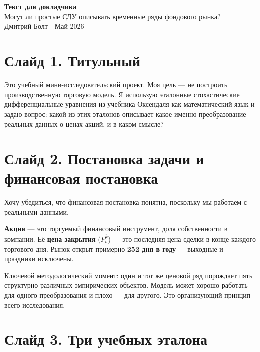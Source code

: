 \documentclass[12pt,a4paper]{article}
\begin{document}
\begin{center}
  {\LARGE\bfseries Текст для докладчика}\\[6pt]
  {\large Могут ли простые СДУ описывать временные ряды фондового рынка?}\\[4pt]
  {\color{slidegray} Дмитрий Болт\quad---\quad Май 2026}
\end{center}

\bigskip

\section{Слайд 1. Титульный}

Это учебный мини-исследовательский проект.
Моя цель --- не построить производственную торговую модель.
Я использую эталонные стохастические дифференциальные уравнения
из учебника Оксендаля как математический язык
и задаю вопрос: какой из этих эталонов описывает
какое именно преобразование реальных данных о ценах акций, и в каком смысле?

\section{Слайд 2. Постановка задачи и финансовая постановка}

Хочу убедиться, что финансовая постановка понятна, поскольку мы работаем
с реальными данными.

\textbf{Акция} --- это торгуемый финансовый инструмент, доля собственности
в компании.
Её \textbf{цена закрытия} ($P_t^k$) --- это последняя цена сделки
в конце каждого торгового дня.
Рынок открыт примерно \textbf{252 дня в году} ---
выходные и праздники исключены.

Ключевой методологический момент: один и тот же ценовой ряд порождает
пять структурно различных эмпирических объектов.
Модель может хорошо работать для одного преобразования и плохо --- для другого.
Это организующий принцип всего исследования.

\section{Слайд 3. Три учебных эталона}
\end{document}
